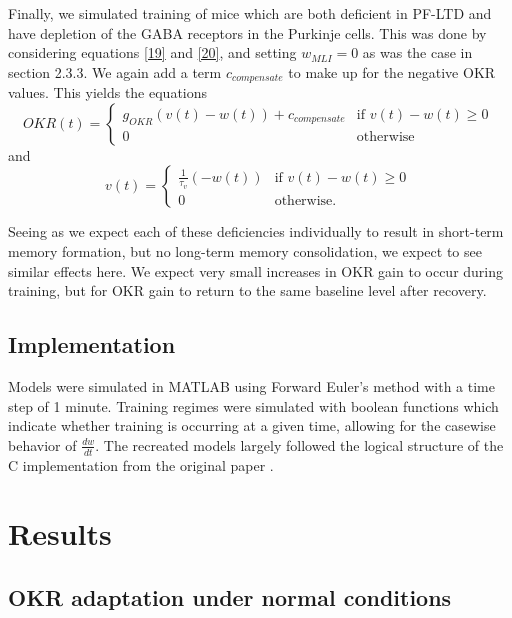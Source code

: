 \documentclass[10pt]{article}
\begin{document}
Finally, we simulated training of mice which are both deficient in PF-LTD and have depletion of the GABA receptors in the Purkinje cells. This was done by considering equations \eqref{19} and \eqref{20}, and setting \(w_{MLI}=0\) as was the case in section 2.3.3. We again add a term \(c_{compensate}\) to make up for the negative OKR values. This yields the equations \begin{equation}
    \label{23}
    OKR(t) = \begin{cases}
        g_{OKR}(v(t)-w(t)) + c_{compensate} & \text{if }v(t)-w(t) \ge 0\ \\
        0 & \text{otherwise}
    \end{cases}
\end{equation} and \begin{equation}
    \label{24}
    v(t) = \begin{cases}
        \frac{1}{\tau_v}(-w(t))& \text{if }v(t)-w(t) \ge 0\ \\
        0 & \text{otherwise.}
    \end{cases}
\end{equation}

Seeing as we expect each of these deficiencies individually to result in short-term memory formation, but no long-term memory consolidation, we expect to see similar effects here. We expect very small increases in OKR gain to occur during training, but for OKR gain to return to the same baseline level after recovery.

\subsection{Implementation}

Models were simulated in MATLAB using Forward Euler's method with a time step of 1 minute. Training regimes were simulated with boolean functions which indicate whether training is occurring at a given time, allowing for the casewise behavior of \(\frac{dw}{dt}\). The recreated models largely followed the logical structure of the C implementation from the original paper \cite{yamazaki2015modeling}.

\section{Results}

\subsection{OKR adaptation under normal conditions}
\end{document}
